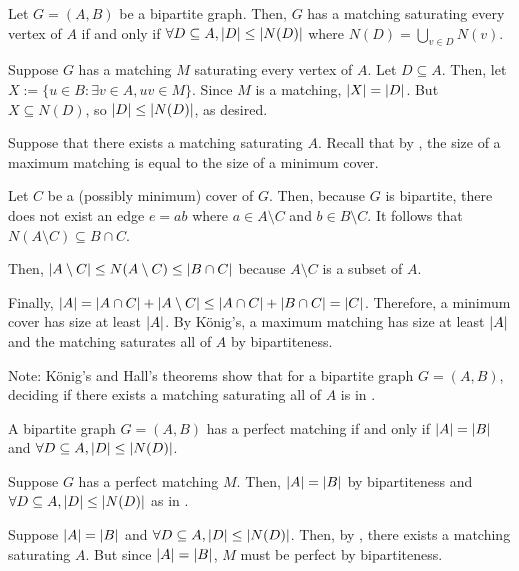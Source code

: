 \begin{theorem}\label{thm:hall}
  Let $G = (A,B)$ be a bipartite graph.
  Then, $G$ has a matching saturating every vertex of $A$
  if and only if $\forall D \subseteq A, \abs{D} \leq \abs{N(D)}$
  where $N(D) = \bigcup\limits_{v \in D} N(v)$.
\end{theorem}
\begin{prf}
  Suppose $G$ has a matching $M$ saturating every vertex of $A$.
  Let $D \subseteq A$.
  Then, let $X := \{u \in B : \exists v \in A, uv \in M\}$.
  Since $M$ is a matching, $\abs{X} = \abs{D}$.
  But $X \subseteq N(D)$, so $\abs{D} \leq \abs{N(D)}$, as desired.

  Suppose that there exists a matching saturating $A$.
  Recall that by , the size of a maximum matching
  is equal to the size of a minimum cover.

  Let $C$ be a (possibly minimum) cover of $G$.
  Then, because $G$ is bipartite, there does not exist an edge $e = ab$
  where $a \in A \setminus C$ and $b \in B \setminus C$.
  It follows that $N(A \setminus C) \subseteq B \cap C$.

  Then, $\abs{A \setminus C} \leq N(A \setminus C) \leq \abs{B \cap C}$
  because $A \setminus C$ is a subset of $A$.

  Finally, $\abs{A} = \abs{A \cap C} + \abs{A \setminus C}
    \leq \abs{A \cap C} + \abs{B \cap C} = \abs{C}$.
  Therefore, a minimum cover has size at least $\abs{A}$.
  By K\"onig's, a maximum matching has size at least $\abs{A}$
  and the matching saturates all of $A$ by bipartiteness.
\end{prf}

Note: K\"onig's and Hall's theorems show that for a bipartite graph $G = (A,B)$,
deciding if there exists a matching saturating all of $A$ is in \coNP.

\begin{corollary}[8.6.1]\label{cor:bip.pm}
  A bipartite graph $G = (A,B)$ has a perfect matching
  if and only if $\abs{A} = \abs{B}$ and $\forall D \subseteq A, \abs{D} \leq \abs{N(D)}$.
\end{corollary}
\begin{prf}
  Suppose $G$ has a perfect matching $M$.
  Then, $\abs{A} = \abs{B}$ by bipartiteness
  and $\forall D \subseteq A, \abs{D} \leq \abs{N(D)}$ as in .

  Suppose $\abs{A} = \abs{B}$ and $\forall D \subseteq A, \abs{D} \leq \abs{N(D)}$.
  Then, by , there exists a matching saturating $A$.
  But since $\abs{A} = \abs{B}$, $M$ must be perfect by bipartiteness.
\end{prf}

